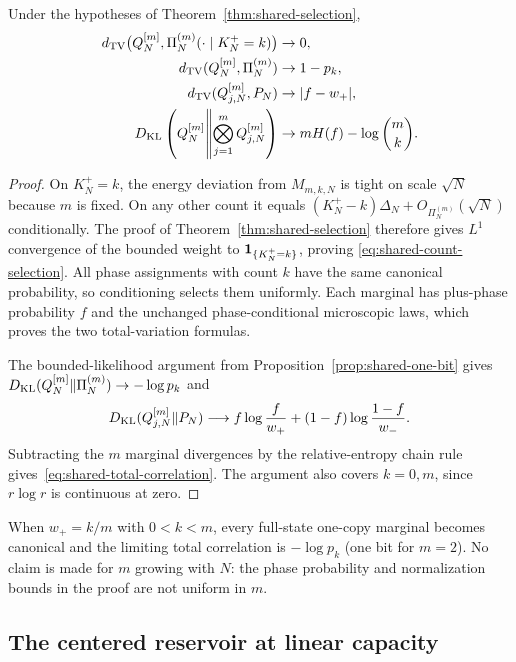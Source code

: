 \begin{proposition}
\label{prop:shared-count}
Under the hypotheses of Theorem~\ref{thm:shared-selection},
\begin{align}
 d_{\mathrm{TV}}\bigl(Q_N^{[m]},\Pi_N^{(m)}(\cdot\mid K^+_N=k)\bigr)&\to0,
 \label{eq:shared-count-selection}\\
 d_{\mathrm{TV}}(Q_N^{[m]},\Pi_N^{(m)})&\to1-p_k,
 \label{eq:shared-count-joint-tv}\\
 d_{\mathrm{TV}}(Q_{j,N}^{[m]},P_N)&\to|f-w_+|,
 \label{eq:shared-count-marginal-tv}\\
 D_{\mathrm{KL}}\left(Q_N^{[m]}\middle\Vert\bigotimes_{j=1}^mQ_{j,N}^{[m]}\right)
   &\to mH(f)-\log\binom mk.
 \label{eq:shared-total-correlation}
\end{align}
\end{proposition}
\begin{proof}
On $K^+_N=k$, the energy deviation from $M_{m,k,N}$ is tight on scale
$\sqrt N$ because $m$ is fixed. On any other count it equals
$(K^+_N-k)\Delta_N+O_{\Pi_N^{(m)}}(\sqrt N)$ conditionally. The proof of
Theorem~\ref{thm:shared-selection} therefore gives $L^1$ convergence
of the bounded weight to $\mathbf 1_{\{K^+_N=k\}}$, proving
\eqref{eq:shared-count-selection}. All phase assignments with count
$k$ have the same canonical probability, so conditioning selects them
uniformly. Each marginal has plus-phase probability $f$ and the
unchanged phase-conditional microscopic laws, which proves the two
total-variation formulas.

The bounded-likelihood argument from
Proposition~\ref{prop:shared-one-bit} gives
$D_{\mathrm{KL}}(Q_N^{[m]}\Vert\Pi_N^{(m)})\to-\log p_k$ and
\[
 D_{\mathrm{KL}}(Q_{j,N}^{[m]}\Vert P_N)
 \longrightarrow f\log\frac f{w_+}+(1-f)\log\frac{1-f}{w_-}.
\]
Subtracting the $m$ marginal divergences by the relative-entropy chain
rule gives~\eqref{eq:shared-total-correlation}. The argument also
covers $k=0,m$, since $r\log r$ is continuous at zero.
\end{proof}

When $w_+=k/m$ with $0<k<m$, every full-state one-copy marginal becomes
canonical and the limiting total correlation is $-\log p_k$ (one bit
for $m=2$). No claim is made for $m$ growing with $N$: the phase
probability and normalization bounds in the proof are not uniform in
$m$.

\subsection{The centered reservoir at linear capacity}
\label{subsec:shared-linear}

